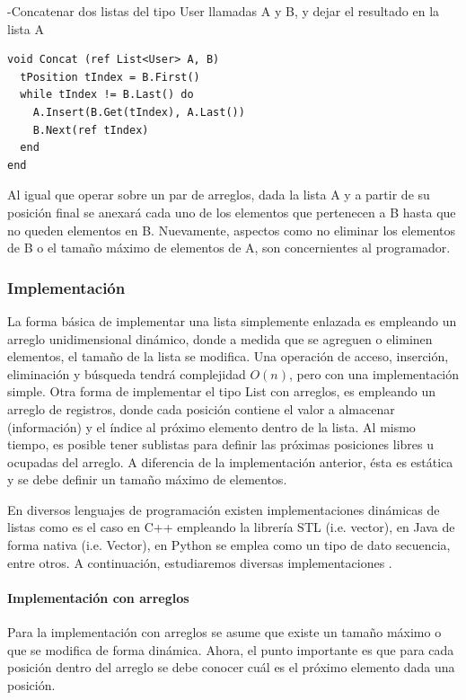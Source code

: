 -Concatenar dos listas del tipo User llamadas A y B, y dejar el resultado en la lista A
\begin{lstlisting}[upquote=true, language=pseudo]
void Concat (ref List<User> A, B)
  tPosition tIndex = B.First()
  while tIndex != B.Last() do
    A.Insert(B.Get(tIndex), A.Last())
    B.Next(ref tIndex)
  end
end
\end{lstlisting}

Al igual que operar sobre un par de arreglos, dada la lista A y a partir de su posición final se anexará cada uno de los elementos que pertenecen a B hasta que no queden elementos en B. Nuevamente, aspectos como no eliminar los elementos de B o el tamaño máximo de elementos de A, son concernientes al programador.

\subsubsection{Implementación}

La forma básica de implementar una lista simplemente enlazada es empleando un arreglo unidimensional dinámico, donde a medida que se agreguen o eliminen elementos, el tamaño de la lista se modifica. Una operación de acceso, inserción, eliminación y búsqueda tendrá complejidad $O(n)$, pero con una implementación simple. Otra forma de implementar el tipo List con arreglos, es empleando un arreglo de registros, donde cada posición contiene el valor a almacenar (información) y el índice al próximo elemento dentro de la lista. Al mismo tiempo, es posible tener sublistas para definir las próximas posiciones libres u ocupadas del arreglo. A diferencia de la implementación anterior, ésta es estática y se debe definir un tamaño máximo de elementos.

En diversos lenguajes de programación existen implementaciones dinámicas de listas como es el caso en C++ empleando la librería STL (i.e. vector), en Java de forma nativa (i.e. Vector), en Python se emplea como un tipo de dato secuencia, entre otros. A continuación, estudiaremos diversas implementaciones . 

\paragraph{Implementación con arreglos}

Para la implementación con arreglos se asume que existe un tamaño máximo o que se modifica de forma dinámica. Ahora, el punto importante es que para cada posición dentro del arreglo se debe conocer cuál es el próximo elemento dada una posición. 

